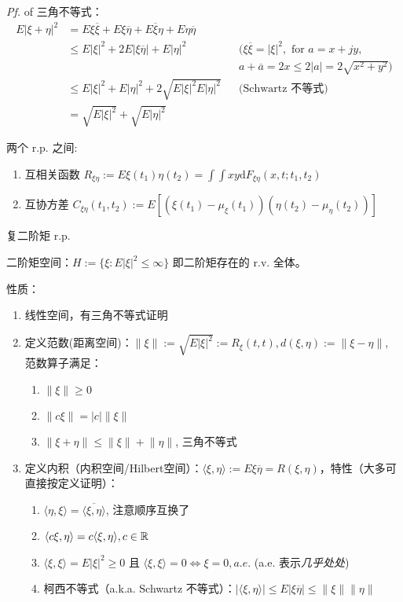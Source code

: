 \emph*{Pf.} of 三角不等式：
\begin{align*}
	E|\xi+\eta|^2 &= E\xi\overline{\xi} + E\xi\overline{\eta} + E\overline{\xi}\eta + E\eta\overline{\eta} \\
	&\le E|\xi|^2 + 2E|\xi\overline{\eta}|+E|\eta|^2 && (\xi\overline{\xi} = |\xi|^2,  \text{ for } a = x +jy,\\
	& &&a + \overline{a} = 2x \le 2|a| = 2\sqrt{x^2+y^2}) \\
	&\le E|\xi|^2 + E|\eta|^2 + 2\sqrt{E|\xi|^2E|\eta|^2} && \text{(Schwartz 不等式)}\\
	&= \sqrt{E|\xi|^2} + \sqrt{E|\eta|^2}
\end{align*}

两个 r.p. 之间:
\begin{enumerate}
	\item 互相关函数 $R_{\xi\eta} := E\xi(t_1)\eta(t_2) = \int \int x y \mathrm{d} F_{\xi\eta}(x,t; t_1, t_2)$
	\item 互协方差 $C_{\xi\eta}(t_1,t_2) := E[(\xi(t_1) - \mu_\xi(t_1))(\eta(t_2) - \mu_\eta(t_2))]$
\end{enumerate}

复二阶矩 r.p.

二阶矩空间：$H:=\{\xi:E|\xi|^2\le\infty\}$ 即二阶矩存在的 r.v. 全体。

性质：
\begin{enumerate}
	\item 线性空间，有三角不等式证明
	\item 定义范数(距离空间)：$\lVert \xi\rVert := \sqrt{E|\xi|^2} := R_\xi(t,t), d(\xi,\eta) := \lVert \xi - \eta \rVert$, 范数算子满足：
	\begin{enumerate}
		\item $\lVert\xi\rVert \ge 0$
		\item $\lVert c\xi \rVert= |c|\lVert \xi \rVert$
		\item $\lVert \xi + \eta \rVert \le \lVert \xi \rVert + \lVert \eta \rVert$, 三角不等式
	\end{enumerate}
\item 定义内积（内积空间/Hilbert空间）：$\langle\xi,\eta\rangle := E\xi\overline{\eta} = R(\xi, \eta)$，特性（大多可直接按定义证明）：
	\begin{enumerate}
		\item $\langle\eta,\xi\rangle = \overline{\langle\xi,\eta\rangle}$, 注意顺序互换了
		\item $\langle c\xi, \eta\rangle = c\langle\xi,\eta\rangle, c \in \mathbb{R}$
		\item $\langle\xi,\xi\rangle = E|\xi|^2\ge0$ 且 $\langle \xi, \xi \rangle = 0 \Leftrightarrow \xi = 0, a.e.$ (a.e. 表示\emph{几乎处处})
		\item 柯西不等式（a.k.a. Schwartz 不等式）：$|\langle \xi, \eta\rangle| \le E|\xi\overline{\eta}| \le \lVert\xi\rVert\lVert\eta\rVert$
	\end{enumerate}
\end{enumerate}

